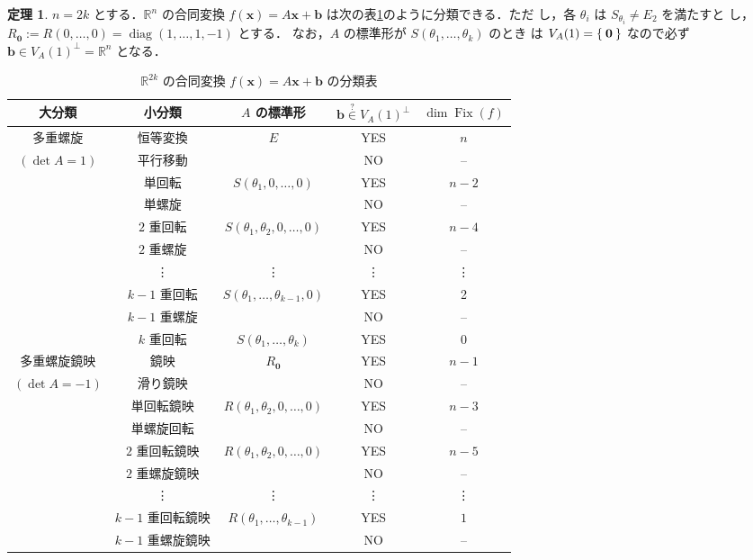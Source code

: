 \documentclass[11pt, uplatex, dvipdfmx, titlepage]{jsarticle}
\DeclareMathOperator{\Fix}{Fix}
\DeclareMathOperator{\diag}{diag}
\theoremstyle{definition}
\newtheorem{theorem}{定理}[section]
\begin{document}
\begin{theorem}\label{thm:classification_even}
  $n=2k$ とする．$\mathbb{R}^{n}$ の合同変換 $f(\bm{x}) = A\bm{x} +
  \bm{b}$ は次の表\ref{tab:classification_even}のように分類できる．ただ
  し，各 $\theta_i$ は $S_{\theta_i} \neq E_2$ を満たすと
  し，$R_{\bm{0}} := R(0, \ldots, 0)= \diag(1,\ldots, 1, -1)$ とする．
  なお，$A$ の標準形が $S(\theta_1, \ldots, \theta_k)$ のとき
  は $V_A(1)=\Set{\bm{0}}$ なので必ず
  $\bm{b} \in V_A(1)^{\perp}=\mathbb{R}^n$ となる．
  \begin{table}[h]
    \centering
    \begin{tabular}[h]{c|c|c|c|c}
      大分類 & 小分類 & $A$ の標準形 & $\bm{b} \overset{?}{\in} V_A(1)^{\perp}$  & $\dim \Fix(f)$  \\ \hline
      多重螺旋 & 恒等変換 & \multirow{2}{*}{$E$} & YES  & $n$\\
      $(\det A =1)$  & 平行移動 & & NO  & --\\ \cline{2-5}
             & 単回転 & \multirow{2}{*}{$S(\theta_1, 0, \ldots, 0)$} & YES & $n-2$\\
             & 単螺旋 & & NO & --\\ \cline{2-5}
             & $2$ 重回転  & \multirow{2}{*}{$S(\theta_1, \theta_2, 0, \ldots, 0)$} & YES & $n-4$\\
             & $2$ 重螺旋 & & NO & -- \\ \cline{2-5}
             & \vdots & \vdots & \vdots & \vdots \\ \cline{2-5}
             & $k-1$ 重回転 & \multirow{2}{*}{$S(\theta_1, \ldots, \theta_{k-1},0)$ } & YES & 2\\
             & $k-1$ 重螺旋 & & NO & -- \\ \cline{2-5}
             & $k$ 重回転 & $S(\theta_1, \ldots, \theta_k)$ & YES & $0$ \\ \hline \hline
      多重螺旋鏡映 &  鏡映 & \multirow{2}{*}{$R_{\bm{0}}$} & YES & $n-1$\\
      $(\det A = -1)$ & 滑り鏡映 & & NO & -- \\ \cline{2-5}
             & 単回転鏡映 & \multirow{2}{*}{$R(\theta_1, \theta_2, 0, \ldots, 0)$} & YES & $n-3$\\
             & 単螺旋回転 & & NO & -- \\ \cline{2-5}
             & $2$ 重回転鏡映 & \multirow{2}{*}{$R(\theta_1, \theta_2, 0, \ldots, 0)$} & YES & $n-5$\\
             & $2$ 重螺旋鏡映 & & NO & -- \\ \cline{2-5}
             & \vdots & \vdots & \vdots & \vdots\\ \cline{2-5}
             & $k-1$ 重回転鏡映 & \multirow{2}{*}{$R(\theta_1, \ldots, \theta_{k-1})$} & YES & $1$\\
             &$k-1$ 重螺旋鏡映 & & NO & --
    \end{tabular}
    \caption{$\mathbb{R}^{2k}$ の合同変換 $f(\bm{x}) = A\bm{x} + \bm{b}$ の分類表}
    \label{tab:classification_even}
  \end{table}


\end{theorem}
\end{document}
